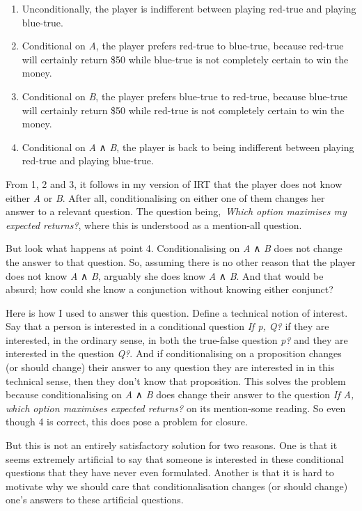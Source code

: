 \documentclass[
  11pt,
]{book}
\providecommand{\tightlist}{%
  \setlength{\itemsep}{0pt}\setlength{\parskip}{0pt}}
\begin{document}
\begin{enumerate}
\def\labelenumi{\arabic{enumi}.}
\tightlist
\item
  Unconditionally, the player is indifferent between playing red-true and playing blue-true.
\item
  Conditional on \emph{A}, the player prefers red-true to blue-true, because red-true will certainly return \$50 while blue-true is not completely certain to win the money.
\item
  Conditional on \emph{B}, the player prefers blue-true to red-true, because blue-true will certainly return \$50 while red-true is not completely certain to win the money.
\item
  Conditional on \emph{A} ∧ \emph{B}, the player is back to being indifferent between playing red-true and playing blue-true.
\end{enumerate}

From 1, 2 and 3, it follows in my version of IRT that the player does not know either \emph{A} or \emph{B}. After all, conditionalising on either one of them changes her answer to a relevant question. The question being,~\emph{Which option maximises my expected returns?}, where this is understood as a mention-all question.

But look what happens at point 4. Conditionalising on \emph{A} ∧ \emph{B} does not change the answer to that question. So, assuming there is no other reason that the player does not know \emph{A} ∧ \emph{B}, arguably she does know \emph{A} ∧ \emph{B}. And that would be absurd; how could she know a conjunction without knowing either conjunct?

Here is how I used to answer this question. Define a technical notion of interest. Say that a person is interested in a conditional question \emph{If p, Q?} if they are interested, in the ordinary sense, in both the true-false question \emph{p?} and they are interested in the question \emph{Q?}. And if conditionalising on a proposition changes (or should change) their answer to any question they are interested in in this technical sense, then they don't know that proposition. This solves the problem because conditionalising on \emph{A} ∧ \emph{B} does change their answer to the question \emph{If A, which option maximises expected returns?} on its mention-some reading. So even though 4 is correct, this does pose a problem for closure.

But this is not an entirely satisfactory solution for two reasons. One is that it seems extremely artificial to say that someone is interested in these conditional questions that they have never even formulated. Another is that it is hard to motivate why we should care that conditionalisation changes (or should change) one's answers to these artificial questions.
\end{document}
